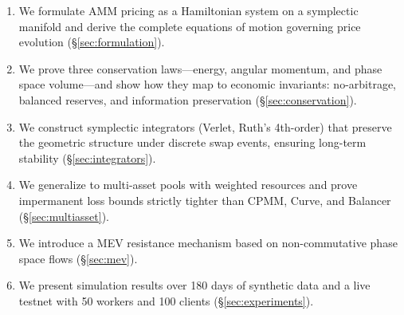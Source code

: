 \begin{enumerate}[leftmargin=1.4em]
    \item We formulate AMM pricing as a Hamiltonian system on a symplectic manifold and derive the complete equations of motion governing price evolution (\S\ref{sec:formulation}).
    \item We prove three conservation laws---energy, angular momentum, and phase space volume---and show how they map to economic invariants: no-arbitrage, balanced reserves, and information preservation (\S\ref{sec:conservation}).
    \item We construct symplectic integrators (Verlet, Ruth's 4th-order) that preserve the geometric structure under discrete swap events, ensuring long-term stability (\S\ref{sec:integrators}).
    \item We generalize to multi-asset pools with weighted resources and prove impermanent loss bounds strictly tighter than CPMM, Curve, and Balancer (\S\ref{sec:multiasset}).
    \item We introduce a MEV resistance mechanism based on non-commutative phase space flows (\S\ref{sec:mev}).
    \item We present simulation results over 180 days of synthetic data and a live testnet with 50 workers and 100 clients (\S\ref{sec:experiments}).
\end{enumerate}

